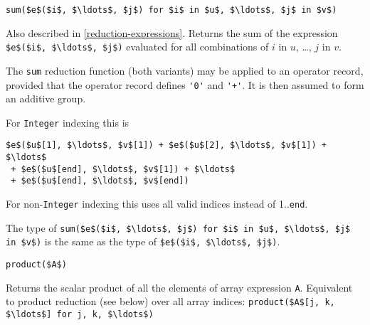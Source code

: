 \begin{operatordefinition*}[sum]\label{modelica:sum-reduction}
\begin{synopsis}\begin{lstlisting}
sum($e$($i$, $\ldots$, $j$) for $i$ in $u$, $\ldots$, $j$ in $v$)
\end{lstlisting}\end{synopsis}
\begin{semantics}
Also described in \cref{reduction-expressions}.  Returns the sum of the expression \lstinline!$e$($i$, $\ldots$, $j$)! evaluated for all combinations of $i$ in $u$, \ldots, $j$ in $v$.

The \lstinline!sum! reduction function (both variants) may be applied to an operator record, provided that the operator record defines \lstinline!'0'! and \lstinline!'+'!.
It is then assumed to form an additive group.

For \lstinline!Integer! indexing this is
\begin{lstlisting}[language=modelica]
$e$($u$[1], $\ldots$, $v$[1]) + $e$($u$[2], $\ldots$, $v$[1]) + $\ldots$
 + $e$($u$[end], $\ldots$, $v$[1]) + $\ldots$
 + $e$($u$[end], $\ldots$, $v$[end])
\end{lstlisting}
For non-\lstinline!Integer! indexing this uses all valid indices instead of 1..\lstinline!end!.

The type of \lstinline!sum($e$($i$, $\ldots$, $j$) for $i$ in $u$, $\ldots$, $j$ in $v$)! is the same as the type of \lstinline!$e$($i$, $\ldots$, $j$)!.
\end{semantics}
\end{operatordefinition*}

\begin{operatordefinition*}[product]\label{modelica:product-of-array}
\begin{synopsis}\begin{lstlisting}
product($A$)
\end{lstlisting}\end{synopsis}
\begin{semantics}
Returns the scalar product of all the elements of array expression \lstinline!A!.  Equivalent to product reduction (see below) over all array indices: \lstinline!product($A$[j, k, $\ldots$] for j, k, $\ldots$)!
\end{semantics}
\end{operatordefinition*}

